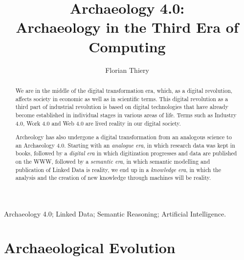 \documentclass[twocolumn]{autart}
\begin{document}
\begin{frontmatter}

\title{Archaeology 4.0: \protect\\ Archaeology in the Third Era of Computing}
                                               

\author[FT]{Florian Thiery}

\address[FT]{rse@fthiery.de - ORCID: 0000-0002-3246-3531 \protect\\ Research Software Engineer, Mainz, Germany}                                         

          
\begin{keyword}                             
Archaeology 4.0; Linked Data; Semantic Reasoning; Artificial Intelligence. 
\end{keyword}

\begin{abstract}                         

We are in the middle of the digital transformation era, which, as a digital revolution, affects society in economic as well as in scientific terms. This digital revolution as a third part of industrial revolution is based on digital technologies that have already become established in individual stages in various areas of life. Terms such as Industry 4.0, Work 4.0 and Web 4.0 are lived reality in our digital society.

Archeology has also undergone a digital transformation from an analogous science to an Archaeology 4.0. Starting with an \textit{analogue era}, in which research data was kept in books, followed by a \textit{digital era} in which digitization progresses and data are published on the WWW, followed by a \textit{semantic era}, in which semantic modelling and publication of Linked Data is reality, we end up in a \textit{knowledge era}, in which the analysis and the creation of new knowledge through machines will be reality.

\end{abstract}

\end{frontmatter}

\section{Archaeological Evolution}
\end{document}
